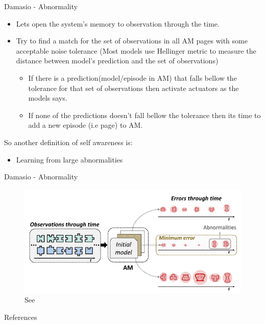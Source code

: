 \documentclass[unknownkeysallowed]{beamer}
\begin{document}
\begin{frame}{Damasio - Abnormality}
	\begin{itemize}
	\item Lets open the system's memory to observation through the time.
	\item Try to find a match for the set of observations in all AM pages with some acceptable noise tolerance (Most models use Hellinger metric to measure the distance between model's prediction and the set of observations)
	\begin{itemize}
	\item If there is a prediction(model/episode in AM) that falls bellow the tolerance for that set of observations then activate actuators as the models says. 
	\item If none of the predictions doesn't fall bellow the tolerance then its time to add a new episode (i.e page) to AM.
	\end{itemize} 
	\end{itemize}
	So another definition of self awareness is:
	\begin{itemize}
	\item Learning from large abnormalities
	\end{itemize}	
\end{frame}

\begin{frame}{Damasio - Abnormality}
	\begin{figure}
	\includegraphics[scale=0.3]{regazzoni-2020-multi-sensorial-generative-and-descriptive-self-awareness-models-for-autonomous-systems-fig-8.png}
	\caption{See \cite{regazzoni-2020-multi-sensorial-generative-and-descriptive-self-awareness-models-for-autonomous-systems}}
	\end{figure}
\end{frame}

\begin{frame}[allowframebreaks]{References}
	\printbibliography
\end{frame}
\end{document}
